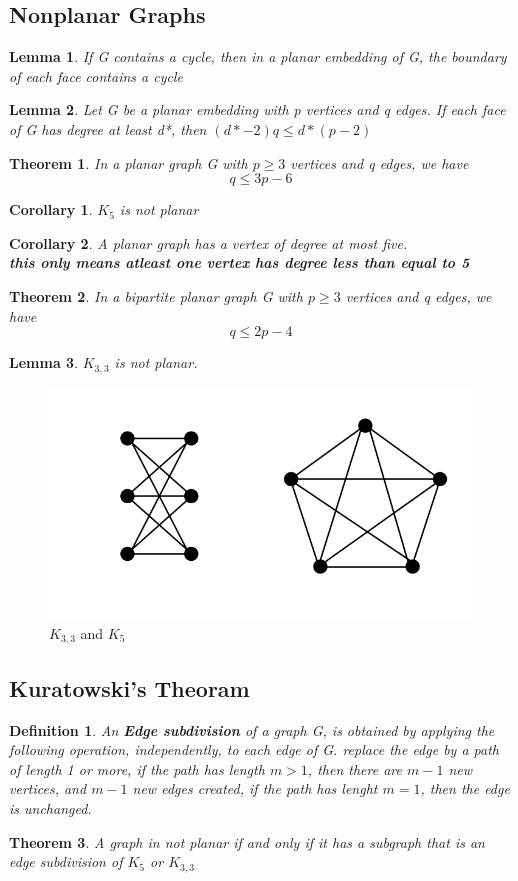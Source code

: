 \documentclass[10pt, a4paper]{article}
\newtheorem*{thm}{Theorem}
\newtheorem*{defn}{Definition}
\newtheorem*{lemma}{Lemma}
\newtheorem*{corol}{Corollary}
\begin{document}
\subsection{Nonplanar Graphs}
\begin{lemma}
    If G contains a cycle, then in a planar embedding of G, the boundary of each face contains a cycle
\end{lemma}
\begin{lemma}
    Let G be a planar embedding with p vertices and q edges. If each face of G has degree at least d*, then $(d*-2)q \le d*(p-2)$
\end{lemma}
\begin{thm}
    In a planar graph G with $p \ge 3$ vertices and q edges, we have 
    \[q \le 3p-6\]
\end{thm}
\begin{corol}
    $K_5$ is not planar
\end{corol}
\begin{corol}
    A planar graph has a vertex of degree at most five. \\
    \textbf{this only means atleast one vertex has degree less than equal to 5}
\end{corol}
\begin{thm}
    In a bipartite planar graph G with $p\ge 3$ vertices and q edges, we have 
    \[q \le 2p -4\]
\end{thm}
\begin{lemma}
    $K_{3,3}$ is not planar.
\end{lemma}
\begin{figure}
    \centering
    \includegraphics{image.png}
    \caption{$K_{3,3}$ and $K_5$}
    \label{fig:enter-label}
\end{figure}
\subsection{Kuratowski's Theoram}
\begin{defn}
    An \textbf{Edge subdivision} of a graph G, is obtained by applying the following operation, independently, to each edge of G. replace the edge by a path of length 1 or more, if the path has length $m > 1$, then there are $m-1$ new vertices, and $m - 1$ new edges created, if the path has lenght $m = 1$, then the edge is unchanged.
\end{defn}
\begin{thm}
    A graph in not planar if and only if it has a subgraph that is an edge subdivision of $K_5$ or $K_{3,3}$
\end{thm}
\end{document}

